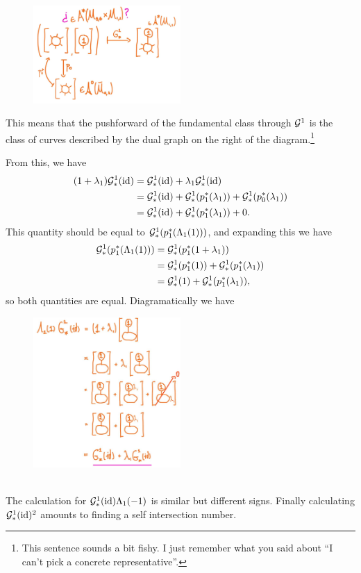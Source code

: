 \documentclass[12pt]{memoir}
\begin{document}
\begin{Ex}
    \begin{figure}[h]
        \centering
        \includegraphics[width=0.5\textwidth, clip]{figs/GluingMapActionEx}
    \end{figure}
    This means that the pushforward of the fundamental class through $\mathcal{G}^1$ is the class of curves described by the dual graph on the right of the diagram.\footnote{This sentence sounds a bit fishy. I just remember what you said about ``I can't pick a concrete representative''.}\par
    From this, we have 
    \begin{align*}
        (1+\lambda_1)\mathcal{G}_\ast^1(\operatorname{id})&=\mathcal{G}_\ast^1(\operatorname{id})+\lambda_1\mathcal{G}_\ast^1(\operatorname{id})\\
        &=\mathcal{G}_\ast^1(\operatorname{id})+\mathcal{G}_\ast^1(p_1^\ast(\lambda_1))+\mathcal{G}_\ast^1(p_0^\ast(\lambda_1))\\
        &=\mathcal{G}_\ast^1(\operatorname{id})+\mathcal{G}_\ast^1(p_1^\ast(\lambda_1))+0.
    \end{align*}
    This quantity should be equal to $\mathcal{G}^1_\ast(p_1^\ast(\Lambda_1(1)))$, and expanding this we have
    \begin{align*}
        \mathcal{G}^1_\ast(p_1^\ast(\Lambda_1(1)))&=\mathcal{G}^1_\ast(p_1^\ast(1+\lambda_1))\\
        &=\mathcal{G}^1_\ast(p_1^\ast(1))+\mathcal{G}^1_\ast(p_1^\ast(\lambda_1))\\
        &=\mathcal{G}^1_\ast(1)+\mathcal{G}^1_\ast(p_1^\ast(\lambda_1)),
    \end{align*}
    so both quantities are equal.\newpage
    Diagramatically we have 
    \begin{figure}[h]
        \centering
        \includegraphics[width=0.5\textwidth, clip]{figs/DiagramGenus1TotChernG1PB}
    \end{figure}\\
    The calculation for $\mathcal{G}^1_\ast(\operatorname{id})\Lambda_1(-1)$ is similar but different signs. Finally calculating $\mathcal{G}_\ast^1(\operatorname{id})^2$ amounts to finding a self intersection number.  
\end{Ex}
\end{document}
